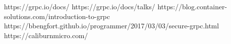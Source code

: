 \documentclass[conference]{IEEEtran}
\begin{document}
\begin{thebibliography}{00}
 https://grpc.io/docs/
 https://grpc.io/docs/talks/
 https://blog.container-solutions.com/introduction-to-grpc
 https://bbengfort.github.io/programmer/2017/03/03/secure-grpc.html
 https://caliburnmicro.com/
\end{thebibliography}
\vspace{12pt}
\end{document}
